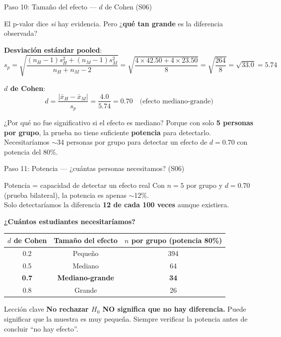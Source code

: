 \documentclass[aspectratio=169, 11pt]{beamer}
\begin{document}
\begin{frame}{Paso 10: Tamaño del efecto --- $d$ de Cohen (S06)}
\small

El p-valor dice \textit{si} hay evidencia. Pero ¿\textbf{qué tan grande} es la diferencia observada?

\vspace{0.2cm}
\textbf{Desviación estándar pooled}:
\[
s_p = \sqrt{\frac{(n_H-1)s_H^2 + (n_M-1)s_M^2}{n_H + n_M - 2}} = \sqrt{\frac{4 \times 42.50 + 4 \times 23.50}{8}} = \sqrt{\frac{264}{8}} = \sqrt{33.0} = 5.74
\]

\textbf{$d$ de Cohen}:
\[
d = \frac{|\bar{x}_H - \bar{x}_M|}{s_p} = \frac{4.0}{5.74} = \boxed{0.70} \quad \text{(efecto mediano-grande)}
\]

\vspace{0.2cm}
\begin{block}{¿Por qué no fue significativo si el efecto es mediano?}
Porque con solo \textbf{5 personas por grupo}, la prueba no tiene suficiente \textbf{potencia} para detectarlo. Necesitaríamos $\sim$34 personas por grupo para detectar un efecto de $d = 0.70$ con potencia del 80\%.
\end{block}
\end{frame}

\begin{frame}{Paso 11: Potencia --- ¿cuántas personas necesitamos? (S06)}
\small

\begin{block}{Potencia = capacidad de detectar un efecto real}
Con $n = 5$ por grupo y $d = 0.70$ (prueba bilateral), la potencia es apenas $\sim$12\%.\\
Solo detectaríamos la diferencia \textbf{12 de cada 100 veces} aunque existiera.
\end{block}

\vspace{0.2cm}
\textbf{¿Cuántos estudiantes necesitaríamos?}
\begin{center}
\begin{tabular}{ccc}
\toprule
$d$ de Cohen & Tamaño del efecto & $n$ por grupo (potencia 80\%) \\
\midrule
0.2 & Pequeño & 394 \\
0.5 & Mediano & 64 \\
\textbf{0.7} & \textbf{Mediano-grande} & \textbf{34} \\
0.8 & Grande & 26 \\
\bottomrule
\end{tabular}
\end{center}

\begin{alertblock}{Lección clave}
\textbf{No rechazar $H_0$ NO significa que no hay diferencia.} Puede significar que la muestra es muy pequeña. Siempre verificar la potencia antes de concluir ``no hay efecto''.
\end{alertblock}
\end{frame}
\end{document}
